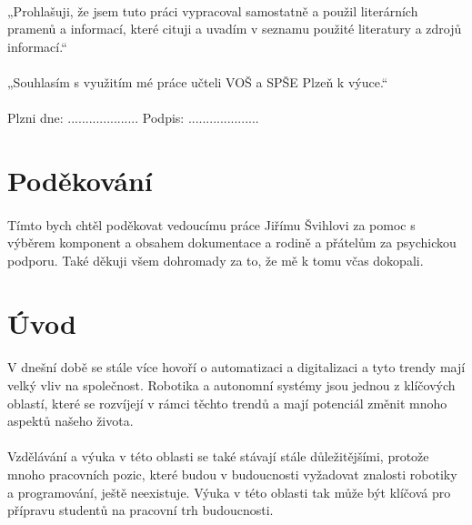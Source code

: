 \documentclass[12pt, a4paper]{article}
\begin{document}
	\paragraph{} „Prohlašuji, že jsem tuto práci vypracoval samostatně a použil literárních pramenů a informací, které cituji a uvadím v seznamu použité literatury a zdrojů informací.“
	\paragraph{} „Souhlasím s využitím mé práce učteli VOŠ a SPŠE Plzeň k výuce.“
	\paragraph{} \hfill Plzni dne: .................... Podpis: ....................
	
	\newpage
	\thispagestyle{empty}
	\section*{Poděkování}
	\paragraph{} Tímto bych chtěl poděkovat vedoucímu práce Jiřímu Švihlovi za pomoc s výběrem komponent a obsahem dokumentace a rodině a přátelům za psychickou podporu. Také děkuji všem dohromady za to, že mě k tomu včas dokopali.
	
	\newpage
	\tableofcontents
	
	\newpage
	\section*{Úvod}
	\paragraph{} V dnešní době se stále více hovoří o automatizaci a digitalizaci a tyto trendy mají velký vliv na společnost. Robotika a autonomní systémy jsou jednou z klíčových oblastí, které se rozvíjejí v rámci těchto trendů a mají potenciál změnit mnoho aspektů našeho života.
	\paragraph{} Vzdělávání a výuka v této oblasti se také stávají stále důležitějšími, protože mnoho pracovních pozic, které budou v budoucnosti vyžadovat znalosti robotiky a programování, ještě neexistuje. Výuka v této oblasti tak může být klíčová pro přípravu studentů na pracovní trh budoucnosti.
\end{document}
